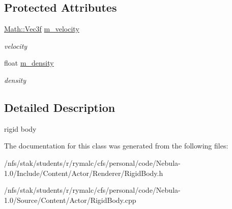 \subsection*{Protected Attributes}
\begin{DoxyCompactItemize}
\item 
\hypertarget{classContent_1_1Actor_1_1RigidBody_acdee50f6d578763c64d0bb05826266c8}{
\hyperlink{classMath_1_1Vec3}{Math::Vec3f} \hyperlink{classContent_1_1Actor_1_1RigidBody_acdee50f6d578763c64d0bb05826266c8}{m\_\-velocity}}
\label{classContent_1_1Actor_1_1RigidBody_acdee50f6d578763c64d0bb05826266c8}

\begin{DoxyCompactList}\small\item\em velocity \item\end{DoxyCompactList}\item 
\hypertarget{classContent_1_1Actor_1_1RigidBody_a9a8b17f3cf296a89b5ec445f65b86b7c}{
float \hyperlink{classContent_1_1Actor_1_1RigidBody_a9a8b17f3cf296a89b5ec445f65b86b7c}{m\_\-density}}
\label{classContent_1_1Actor_1_1RigidBody_a9a8b17f3cf296a89b5ec445f65b86b7c}

\begin{DoxyCompactList}\small\item\em density \item\end{DoxyCompactList}\end{DoxyCompactItemize}


\subsection{Detailed Description}
rigid body 

The documentation for this class was generated from the following files:\begin{DoxyCompactItemize}
\item 
/nfs/stak/students/r/rymalc/cfs/personal/code/Nebula-\/1.0/Include/Content/Actor/Renderer/RigidBody.h\item 
/nfs/stak/students/r/rymalc/cfs/personal/code/Nebula-\/1.0/Source/Content/Actor/RigidBody.cpp\end{DoxyCompactItemize}
